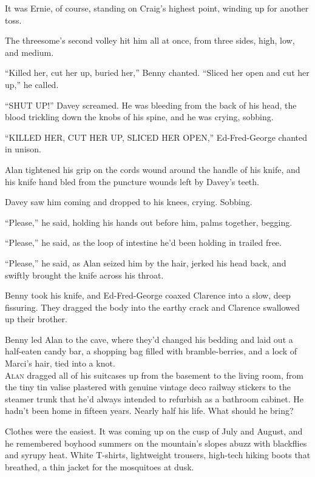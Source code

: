 It was Ernie, of course, standing on Craig's highest point, winding up
for another toss.

The threesome's second volley hit him all at once, from three sides,
high, low, and medium.

``Killed her, cut her up, buried her,'' Benny chanted.  ``Sliced her
open and cut her up,'' he called.

``SHUT UP!'' Davey screamed.  He was bleeding from the back of his
head, the blood trickling down the knobs of his spine, and he was
crying, sobbing.

``KILLED HER, CUT HER UP, SLICED HER OPEN,'' Ed-Fred-George chanted in
unison.

Alan tightened his grip on the cords wound around the handle of his
knife, and his knife hand bled from the puncture wounds left by
Davey's teeth.

Davey saw him coming and dropped to his knees, crying.  Sobbing.

``Please,'' he said, holding his hands out before him, palms together,
begging.

``Please,'' he said, as the loop of intestine he'd been holding in
trailed free.

``Please,'' he said, as Alan seized him by the hair, jerked his head
back, and swiftly brought the knife across his throat.

Benny took his knife, and Ed-Fred-George coaxed Clarence into a slow,
deep fissuring.  They dragged the body into the earthy crack and
Clarence swallowed up their brother.

Benny led Alan to the cave, where they'd changed his bedding and laid
out a half-eaten candy bar, a shopping bag filled with
bramble-berries, and a lock of Marci's hair, tied into a knot.
\\
\lettrine[lines=3, lhang=.5, nindent=0pt, findent=2pt]{A}{lan} dragged all of his suitcases up from the basement to the living
room, from the tiny tin valise plastered with genuine vintage deco
railway stickers to the steamer trunk that he'd always intended to
refurbish as a bathroom cabinet.  He hadn't been home in fifteen
years.  Nearly half his life.  What should he bring?

Clothes were the easiest.  It was coming up on the cusp of July and
August, and he remembered boyhood summers on the mountain's slopes
abuzz with blackflies and syrupy heat.  White T-shirts, lightweight
trousers, high-tech hiking boots that breathed, a thin jacket for the
mosquitoes at dusk.

